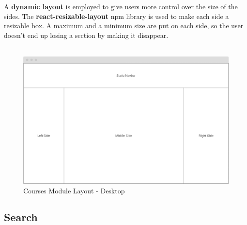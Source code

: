 \noindent A \textbf{dynamic layout} is employed to give users more control over the size of the sides. The \textbf{react-resizable-layout} npm library is used to make each side a resizable box. A maximum and a minimum size are put on each side, so the user doesn't end up losing a section by making it disappear.
\\\\
\begin{figure}[h]
  \centering
  \includegraphics[scale=0.6]{images/courses-layout.png}
  \caption{Courses Module Layout - Desktop}
  \label{fig:figure10}
\end{figure}

\subsection{Search}

